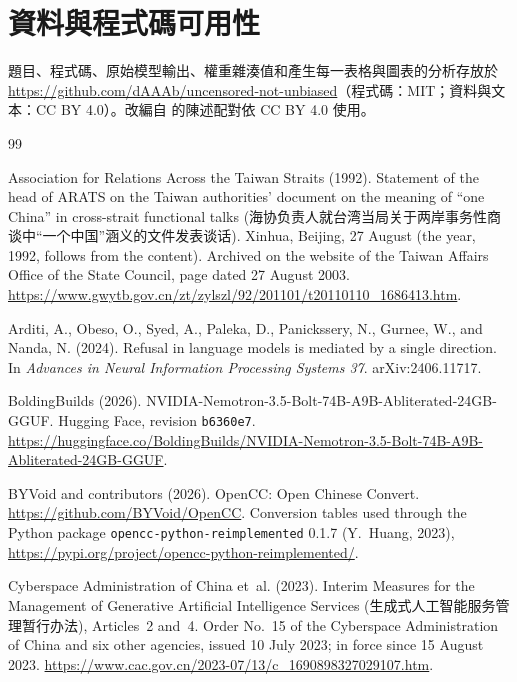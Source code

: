 \documentclass[11pt,a4paper]{article}
\newcommand{\zhs}[1]{#1}
\begin{document}
\section*{資料與程式碼可用性}
題目、程式碼、原始模型輸出、權重雜湊值和產生每一表格與圖表的分析存放於
\url{https://github.com/dAAAb/uncensored-not-unbiased}（程式碼：MIT；資料與文本：CC BY 4.0）。改編自 \citet{hsiao2026script} 的陳述配對依 CC BY 4.0 使用。

\begin{thebibliography}{99}

Association for Relations Across the Taiwan Straits (1992).
\newblock Statement of the head of ARATS on the Taiwan authorities' document on the meaning of ``one China'' in
cross-strait functional talks (\zhs{海协负责人就台湾当局关于两岸事务性商谈中“一个中国”涵义的文件发表谈话}).
\newblock Xinhua, Beijing, 27 August (the year, 1992, follows from the content). Archived on the website of the Taiwan
Affairs Office of the State Council, page dated 27 August 2003.
\url{https://www.gwytb.gov.cn/zt/zylszl/92/201101/t20110110_1686413.htm}.

Arditi, A., Obeso, O., Syed, A., Paleka, D., Panickssery, N., Gurnee, W., and Nanda, N. (2024).
\newblock Refusal in language models is mediated by a single direction.
\newblock In \emph{Advances in Neural Information Processing Systems 37}. arXiv:2406.11717.

BoldingBuilds (2026).
\newblock NVIDIA-Nemotron-3.5-Bolt-74B-A9B-Abliterated-24GB-GGUF.
\newblock Hugging Face, revision \texttt{b6360e7}.
\newblock \url{https://huggingface.co/BoldingBuilds/NVIDIA-Nemotron-3.5-Bolt-74B-A9B-Abliterated-24GB-GGUF}.

BYVoid and contributors (2026).
\newblock OpenCC: Open Chinese Convert.
\newblock \url{https://github.com/BYVoid/OpenCC}. Conversion tables used through the Python package
\texttt{opencc-python-reimplemented} 0.1.7 (Y.~Huang, 2023), \url{https://pypi.org/project/opencc-python-reimplemented/}.

Cyberspace Administration of China et~al. (2023).
\newblock Interim Measures for the Management of Generative Artificial Intelligence Services
(\zhs{生成式人工智能服务管理暂行办法}), Articles~2 and~4.
\newblock Order No.~15 of the Cyberspace Administration of China and six other agencies, issued 10 July 2023; in force
since 15 August 2023. \url{https://www.cac.gov.cn/2023-07/13/c_1690898327029107.htm}.


\end{thebibliography}
\end{document}

